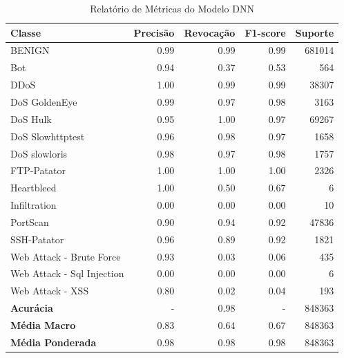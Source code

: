 \documentclass[12pt,oneside]{abntex2}
\begin{document}
\begin{table}[H]
\centering
\small
\begin{tabular}{lrrrr}
\toprule
Classe & Precisão & Revocação & F1-score & Suporte \\
\midrule
BENIGN & 0.99 & 0.99 & 0.99 & 681014 \\
Bot & 0.94 & 0.37 & 0.53 & 564 \\
DDoS & 1.00 & 0.99 & 0.99 & 38307 \\
DoS GoldenEye & 0.99 & 0.97 & 0.98 & 3163 \\
DoS Hulk & 0.95 & 1.00 & 0.97 & 69267 \\
DoS Slowhttptest & 0.96 & 0.98 & 0.97 & 1658 \\
DoS slowloris & 0.98 & 0.97 & 0.98 & 1757 \\
FTP-Patator & 1.00 & 1.00 & 1.00 & 2326 \\
Heartbleed & 1.00 & 0.50 & 0.67 & 6 \\
Infiltration & 0.00 & 0.00 & 0.00 & 10 \\
PortScan & 0.90 & 0.94 & 0.92 & 47836 \\
SSH-Patator & 0.96 & 0.89 & 0.92 & 1821 \\
Web Attack - Brute Force & 0.93 & 0.03 & 0.06 & 435 \\
Web Attack - Sql Injection & 0.00 & 0.00 & 0.00 & 6 \\
Web Attack - XSS & 0.80 & 0.02 & 0.04 & 193 \\
\midrule
\textbf{Acurácia} & - & 0.98 & -  & 848363 \\
\textbf{Média Macro} & 0.83 & 0.64 & 0.67 & 848363 \\
\textbf{Média Ponderada} & 0.98 & 0.98 & 0.98 & 848363 \\
\bottomrule
\end{tabular}
\caption{Relatório de Métricas do Modelo DNN}
\label{table:rel_metr_DNN}
\end{table}
\end{document}
